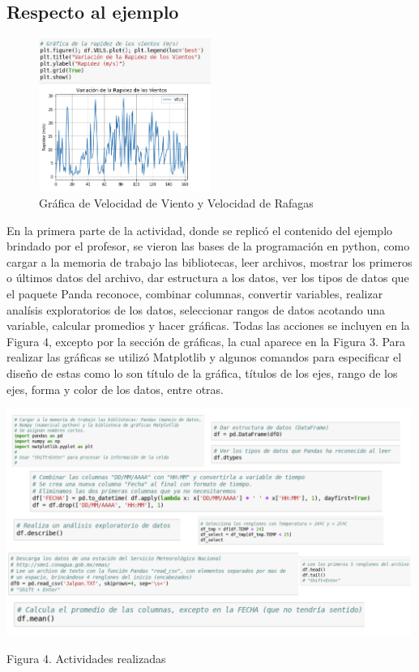 \documentclass{article} %
\begin{document}
\subsection {Respecto al ejemplo}
\begin{figure}
  \centering
  \includegraphics[width=0.5\textwidth]{Rapidez.png}
  \caption{Gráfica de Velocidad de Viento y Velocidad de Rafagas }
  \label{fig:Actividades}
 \end{figure}
 En la primera parte de la actividad, donde se replicó el contenido del ejemplo brindado por el profesor, se vieron las bases de la programación en python, como cargar a la memoria de trabajo las bibliotecas, leer archivos, mostrar los primeros o últimos datos del archivo, dar estructura a los datos, ver los tipos de datos que el paquete Panda reconoce, combinar columnas, convertir variables, realizar analísis exploratorios de los datos, seleccionar rangos de datos acotando una variable, calcular promedios y hacer gráficas. Todas las acciones se incluyen en la Figura 4, excepto por la sección de gráficas, la cual aparece en la Figura 3. Para realizar las gráficas se utilizó Matplotlib y algunos comandos para especificar el diseño de estas como lo son título de la gráfica, títulos de los ejes, rango de los ejes, forma y color de los datos, 
entre otras.
\begin{center}

    \includegraphics[width=0.99\textwidth]{Acciones.png}

   Figura 4. Actividades realizadas

\end{center}
\end{document}
